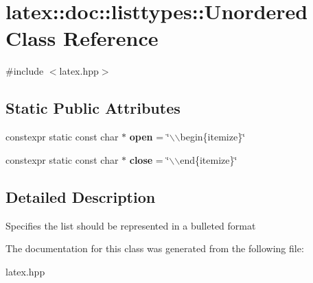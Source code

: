 \hypertarget{classlatex_1_1doc_1_1listtypes_1_1Unordered}{\section{latex\-:\-:doc\-:\-:listtypes\-:\-:\-Unordered \-Class \-Reference}
\label{classlatex_1_1doc_1_1listtypes_1_1Unordered}
}


{\ttfamily \#include $<$latex.\-hpp$>$}

\subsection*{\-Static \-Public \-Attributes}
\begin{DoxyCompactItemize}
\item 
\hypertarget{classlatex_1_1doc_1_1listtypes_1_1Unordered_a6785c1fc27b26fff3053c51a65a03be4}{constexpr static const char $\ast$ {\bfseries open} = \char`\"{}$\backslash$$\backslash$begin\{itemize\}\char`\"{}}\label{classlatex_1_1doc_1_1listtypes_1_1Unordered_a6785c1fc27b26fff3053c51a65a03be4}

\item 
\hypertarget{classlatex_1_1doc_1_1listtypes_1_1Unordered_ad2f22acaf4323ed68d3bebffec7a069e}{constexpr static const char $\ast$ {\bfseries close} = \char`\"{}$\backslash$$\backslash$end\{itemize\}\char`\"{}}\label{classlatex_1_1doc_1_1listtypes_1_1Unordered_ad2f22acaf4323ed68d3bebffec7a069e}

\end{DoxyCompactItemize}


\subsection{\-Detailed \-Description}
\-Specifies the list should be represented in a bulleted format 

\-The documentation for this class was generated from the following file\-:\begin{DoxyCompactItemize}
\item 
latex.\-hpp\end{DoxyCompactItemize}
